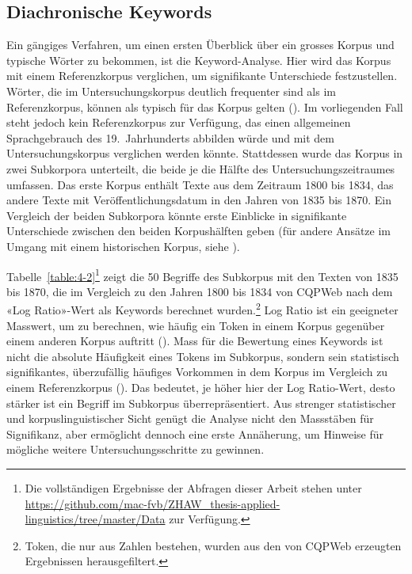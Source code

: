 \subsection{Diachronische Keywords}

Ein gängiges Verfahren, um einen ersten Überblick über ein grosses Korpus und typische Wörter zu bekommen, ist die Keyword-Analyse. Hier wird das Korpus mit einem Referenzkorpus verglichen, um signifikante Unterschiede festzustellen. Wörter, die im Untersuchungskorpus deutlich frequenter sind als im Referenzkorpus, können als typisch für das Korpus gelten (\cite[74]{bubenhofer_kollokationen_2017}). Im vorliegenden Fall steht jedoch kein Referenzkorpus zur Verfügung, das einen allgemeinen Sprachgebrauch des 19.~Jahrhunderts abbilden würde und mit dem Untersuchungskorpus verglichen werden könnte. Stattdessen wurde das Korpus in zwei Subkorpora unterteilt, die beide je die Hälfte des Untersuchungszeitraumes umfassen. Das erste Korpus enthält Texte aus dem Zeitraum 1800 bis 1834, das andere Texte mit Veröffentlichungsdatum in den Jahren von 1835 bis 1870. Ein Vergleich der beiden Subkorpora könnte erste Einblicke in signifikante Unterschiede zwischen den beiden Korpushälften geben (für andere Ansätze im Umgang mit einem historischen Korpus, siehe \cite{bubenhofer_korpuspragmatische_2014}).

Tabelle~\ref{table:4-2}\footnote{Die vollständigen Ergebnisse der Abfragen dieser Arbeit stehen unter \url{https://github.com/mac-fvb/ZHAW_thesis-applied-linguistics/tree/master/Data} zur Verfügung.} zeigt die 50 Begriffe des Subkorpus mit den Texten von 1835 bis 1870, die im Vergleich zu den Jahren 1800 bis 1834 von CQPWeb nach dem «Log Ratio»-Wert als Keywords berechnet wurden.\footnote{Token, die nur aus Zahlen bestehen, wurden aus den von CQPWeb erzeugten Ergebnissen herausgefiltert.} Log Ratio ist ein geeigneter Masswert, um zu berechnen, wie häufig ein Token in einem Korpus gegenüber einem anderen Korpus auftritt (\cite{hardie_log_2014}). Mass für die Bewertung eines Keywords ist nicht die absolute Häufigkeit eines Tokens im Subkorpus, sondern sein statistisch signifikantes, überzufällig häufiges Vorkommen in dem Korpus im Vergleich zu einem Referenzkorpus (\cite{gabrielatos_keyness_2018}). Das bedeutet, je höher hier der Log Ratio-Wert, desto stärker ist ein Begriff im Subkorpus überrepräsentiert. Aus strenger statistischer und korpuslinguistischer Sicht genügt die Analyse nicht den Massstäben für Signifikanz, aber ermöglicht dennoch eine erste Annäherung, um Hinweise für mögliche weitere Untersuchungsschritte zu gewinnen.

